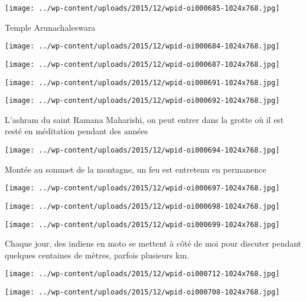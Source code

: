 \centerline{\texttt{[image: ../wp-content/uploads/2015/12/wpid-oi000685-1024x768.jpg]} } 
 \newline
 Temple Arunachaleswara \newline
 \newline
\centerline{\texttt{[image: ../wp-content/uploads/2015/12/wpid-oi000684-1024x768.jpg]} } 
 \newline
 \newline
\centerline{\texttt{[image: ../wp-content/uploads/2015/12/wpid-oi000687-1024x768.jpg]} } 
 \newline
 \newline
\centerline{\texttt{[image: ../wp-content/uploads/2015/12/wpid-oi000691-1024x768.jpg]} } 
 \newline
 \newline
\centerline{\texttt{[image: ../wp-content/uploads/2015/12/wpid-oi000692-1024x768.jpg]} } 
 \newline
 L'ashram du saint Ramana Maharishi, on peut entrer dans la grotte où il est resté en méditation pendant des années \newline
 \newline
\centerline{\texttt{[image: ../wp-content/uploads/2015/12/wpid-oi000694-1024x768.jpg]} } 
 \newline
 Montée au sommet de la montagne, un feu est entretenu en permanence \newline
 \newline
\centerline{\texttt{[image: ../wp-content/uploads/2015/12/wpid-oi000697-1024x768.jpg]} } 
 \newline
 \newline
\centerline{\texttt{[image: ../wp-content/uploads/2015/12/wpid-oi000698-1024x768.jpg]} } 
 \newline
 \newline
\centerline{\texttt{[image: ../wp-content/uploads/2015/12/wpid-oi000699-1024x768.jpg]} } 
 \newline
 Chaque jour, des indiens en moto se mettent à côté de moi pour discuter pendant quelques centaines de mètres, parfois plusieurs km. \newline
 \newline
\centerline{\texttt{[image: ../wp-content/uploads/2015/12/wpid-oi000712-1024x768.jpg]} } 
 \newline
 \newline
\centerline{\texttt{[image: ../wp-content/uploads/2015/12/wpid-oi000708-1024x768.jpg]} } 
